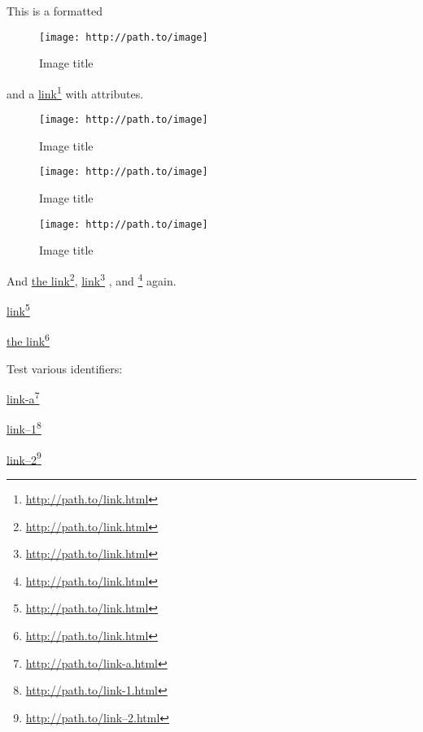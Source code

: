 
\def\mytitle{Link Attributes Test}

This is a formatted \begin{figure}[htbp]
\centering
\texttt{[image: http://path.to/image]}
\caption{Image title}
\label{image}
\end{figure}
 and a \href{http://path.to/link.html}{link}\footnote{\href{http://path.to/link.html}{http:\slash \slash path.to\slash link.html}} with attributes.

\begin{figure}[htbp]
\centering
\texttt{[image: http://path.to/image]}
\caption{Image title}
\label{image2}
\end{figure}


\begin{figure}[htbp]
\centering
\texttt{[image: http://path.to/image]}
\caption{Image title}
\label{image3}
\end{figure}


\begin{figure}[htbp]
\centering
\texttt{[image: http://path.to/image]}
\caption{Image title}
\label{image4}
\end{figure}


And \href{http://path.to/link.html}{the link}\footnote{\href{http://path.to/link.html}{http:\slash \slash path.to\slash link.html}}, \href{http://path.to/link.html}{link}\footnote{\href{http://path.to/link.html}{http:\slash \slash path.to\slash link.html}} , and \href{http://path.to/link.html}{}\footnote{\href{http://path.to/link.html}{http:\slash \slash path.to\slash link.html}} again.

\href{http://path.to/link.html}{link}\footnote{\href{http://path.to/link.html}{http:\slash \slash path.to\slash link.html}}

\href{http://path.to/link.html}{the link}\footnote{\href{http://path.to/link.html}{http:\slash \slash path.to\slash link.html}}

Test various identifiers:

\href{http://path.to/link-a.html}{link-a}\footnote{\href{http://path.to/link-a.html}{http:\slash \slash path.to\slash link-a.html}}

\href{http://path.to/link-1.html}{link--1}\footnote{\href{http://path.to/link-1.html}{http:\slash \slash path.to\slash link-1.html}}

\href{http://path.to/link--2.html}{link--2}\footnote{\href{http://path.to/link--2.html}{http:\slash \slash path.to\slash link--2.html}}

